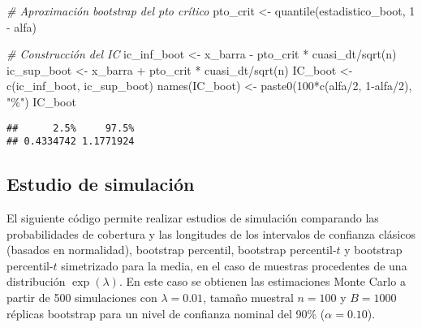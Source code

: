 \documentclass[
]{book}
\newenvironment{Shaded}{\begin{snugshade}}{\end{snugshade}}
\newcommand{\CommentTok}[1]{\textcolor[rgb]{0.56,0.35,0.01}{\textit{#1}}}
\newcommand{\DecValTok}[1]{\textcolor[rgb]{0.00,0.00,0.81}{#1}}
\newcommand{\FunctionTok}[1]{\textcolor[rgb]{0.00,0.00,0.00}{#1}}
\newcommand{\NormalTok}[1]{#1}
\newcommand{\OtherTok}[1]{\textcolor[rgb]{0.56,0.35,0.01}{#1}}
\newcommand{\SpecialCharTok}[1]{\textcolor[rgb]{0.00,0.00,0.00}{#1}}
\newcommand{\StringTok}[1]{\textcolor[rgb]{0.31,0.60,0.02}{#1}}
\theoremstyle{break}
\theoremstyle{definition}
\theoremstyle{definition}
\theoremstyle{definition}
\theoremstyle{definition}
\theoremstyle{remark}
\begin{document}
\begin{Shaded}
\begin{Highlighting}[]
\CommentTok{\# Aproximación bootstrap del pto crítico}
\NormalTok{pto\_crit }\OtherTok{\textless{}{-}} \FunctionTok{quantile}\NormalTok{(estadistico\_boot, }\DecValTok{1} \SpecialCharTok{{-}}\NormalTok{ alfa)}

\CommentTok{\# Construcción del IC}
\NormalTok{ic\_inf\_boot }\OtherTok{\textless{}{-}}\NormalTok{ x\_barra }\SpecialCharTok{{-}}\NormalTok{ pto\_crit }\SpecialCharTok{*}\NormalTok{ cuasi\_dt}\SpecialCharTok{/}\FunctionTok{sqrt}\NormalTok{(n)}
\NormalTok{ic\_sup\_boot }\OtherTok{\textless{}{-}}\NormalTok{ x\_barra }\SpecialCharTok{+}\NormalTok{ pto\_crit }\SpecialCharTok{*}\NormalTok{ cuasi\_dt}\SpecialCharTok{/}\FunctionTok{sqrt}\NormalTok{(n)}
\NormalTok{IC\_boot }\OtherTok{\textless{}{-}} \FunctionTok{c}\NormalTok{(ic\_inf\_boot, ic\_sup\_boot)}
\FunctionTok{names}\NormalTok{(IC\_boot) }\OtherTok{\textless{}{-}} \FunctionTok{paste0}\NormalTok{(}\DecValTok{100}\SpecialCharTok{*}\FunctionTok{c}\NormalTok{(alfa}\SpecialCharTok{/}\DecValTok{2}\NormalTok{, }\DecValTok{1}\SpecialCharTok{{-}}\NormalTok{alfa}\SpecialCharTok{/}\DecValTok{2}\NormalTok{), }\StringTok{"\%"}\NormalTok{)}
\NormalTok{IC\_boot}
\end{Highlighting}
\end{Shaded}

\begin{verbatim}
##      2.5%     97.5% 
## 0.4334742 1.1771924
\end{verbatim}

\hypertarget{estudio-sim-exp}{%
\subsection{Estudio de simulación}\label{estudio-sim-exp}}

El siguiente código permite realizar estudios de
simulación comparando las probabilidades de cobertura y las longitudes
de los intervalos de confianza clásicos (basados en normalidad),
bootstrap percentil, bootstrap percentil-\(t\) y bootstrap percentil-\(t\)
simetrizado para la media, en el caso de muestras procedentes de una
distribución \(\exp \left( \lambda \right)\).
En este caso se obtienen las estimaciones Monte Carlo a partir de 500
simulaciones con \(\lambda = 0.01\), tamaño muestral \(n=100\) y \(B=1000\) réplicas
bootstrap para un nivel de confianza nominal del 90\% (\(\alpha =0.10\)).
\end{document}
